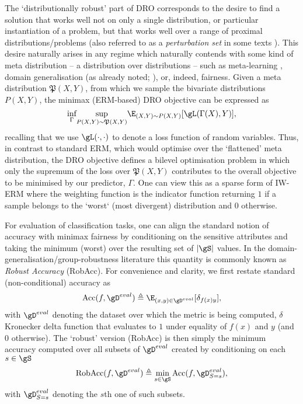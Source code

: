 The `distributionally robust' part of DRO corresponds to the desire to find a solution that works
well not on only a single distribution, or particular instantiation of a problem, but that works
well over a range of proximal distributions/problems (also referred to as a \emph{perturbation
set} in some texts \citep{ben2009robust}). 
%
This desire naturally arises in any regime which naturally contends with some kind of meta
distribution -- a distribution over distributions -- such as meta-learning \citep{collins2020task},
domain generalisation (as already noted; \cite{sagawa2019distributionally}), or, indeed, fairness.
%
Given a meta distribution \(\mathfrak{P}(X, Y)\), from which we sample the bivariate distributions \(
P(X, Y) \), the minimax (ERM-based) DRO objective can be expressed as 
%
\begin{equation}
    \underset{\Gamma}{\text{inf}} 
    \underset{P(X, Y) \sim \mathfrak{P}(X, Y)}{\text{sup}}
    \E_{(X, Y) \sim P(X, Y)}[\gL(\Gamma(X), Y) ],
 \end{equation}
%
recalling that we use \(\gL(\cdot, \cdot)\) to denote a loss function of random variables.
%
Thus, in contrast to standard ERM, which would optimise over the `flattened' meta distribution, the
DRO objective defines a bilevel optimisation problem in which only the supremum of the loss
over \( \mathfrak{P}(X, Y) \) contributes to the overall objective to be minimised by our
predictor, \(\Gamma\).
%
One can view this as a sparse form of IW-ERM where the weighting function is the indicator function
returning \(1\) if a sample belongs to the `worst` (most divergent) distribution and \(0\)
otherwise.

%
For evaluation of classification tasks, one can align the standard notion of accuracy with minimax
fairness by conditioning on the sensitive attributes and taking the minimum (worst) over the
resulting set of \(|\gS|\) values. 
%
In the domain-generalisation/group-robustness literature this quantity is commonly known as
\emph{Robust Accuracy} (RobAcc).
%
For convenience and clarity, we first restate standard (non-conditional) accuracy as 
%
\begin{equation}
    \text{Acc}(f, \gD^{eval}) \triangleq 
    \E_{ (x, y) \in \gD^{eval}}[ \delta_{f(x)y} ],
 \end{equation}
%
with \( \gD^{eval} \) denoting the dataset over which the metric is being computed, \( \delta
\) Kronecker delta function that evaluates to \(1\) under equality of \(f(x)\) and \(y\) (and \(0\)
otherwise).
%
The `robust' version (RobAcc) is then simply the minimum accuracy computed over all subsets of \(
\gD^{eval} \) created by conditioning on each \(s \in \gS \)
%
\begin{equation}
    \text{RobAcc}(f, \gD^{eval}) \triangleq 
    \underset{s \in \gS}{\text{min}} \, \text{Acc}(f, \gD^{eval}_{S=s}),
 \end{equation}
%
 with \( \gD^{eval}_{S=s} \) denoting the \(s\)th one of such subsets.

